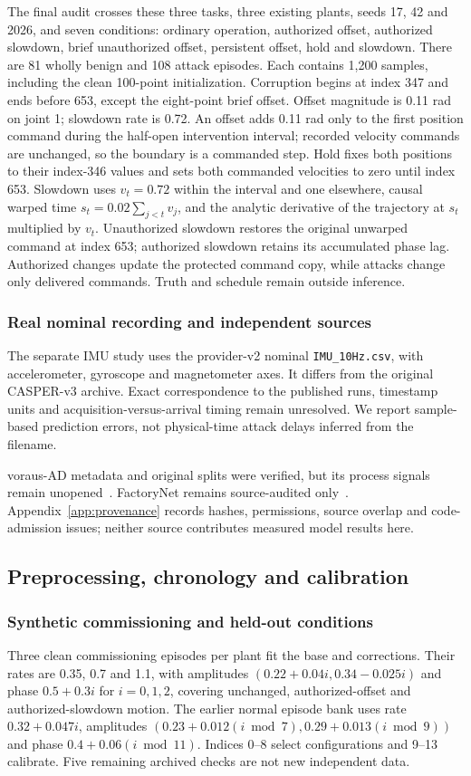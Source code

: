 The final audit crosses these three tasks, three existing plants, seeds 17, 42 and 2026, and seven conditions: ordinary operation, authorized offset, authorized slowdown, brief unauthorized offset, persistent offset, hold and slowdown. There are 81 wholly benign and 108 attack episodes. Each contains 1,200 samples, including the clean 100-point initialization. Corruption begins at index 347 and ends before 653, except the eight-point brief offset. Offset magnitude is 0.11 rad on joint 1; slowdown rate is 0.72. An offset adds 0.11 rad only to the first position command during the half-open intervention interval; recorded velocity commands are unchanged, so the boundary is a commanded step. Hold fixes both positions to their index-346 values and sets both commanded velocities to zero until index 653. Slowdown uses $v_t=0.72$ within the interval and one elsewhere, causal warped time $s_t=0.02\sum_{j<t}v_j$, and the analytic derivative of the trajectory at $s_t$ multiplied by $v_t$. Unauthorized slowdown restores the original unwarped command at index 653; authorized slowdown retains its accumulated phase lag. Authorized changes update the protected command copy, while attacks change only delivered commands. Truth and schedule remain outside inference.

\subsubsection{Real nominal recording and independent sources}
The separate IMU study uses the provider-v2 nominal \texttt{IMU\_10Hz.csv}, with accelerometer, gyroscope and magnetometer axes. It differs from the original CASPER-v3 archive. Exact correspondence to the published runs, timestamp units and acquisition-versus-arrival timing remain unresolved. We report sample-based prediction errors, not physical-time attack delays inferred from the filename.

voraus-AD metadata and original splits were verified, but its process signals remain unopened~\cite{voraus}. FactoryNet remains source-audited only~\cite{factory}. Appendix~\ref{app:provenance} records hashes, permissions, source overlap and code-admission issues; neither source contributes measured model results here.

\subsection{Preprocessing, chronology and calibration}
\subsubsection{Synthetic commissioning and held-out conditions}
Three clean commissioning episodes per plant fit the base and corrections. Their rates are 0.35, 0.7 and 1.1, with amplitudes $(0.22+0.04i,0.34-0.025i)$ and phase $0.5+0.3i$ for $i=0,1,2$, covering unchanged, authorized-offset and authorized-slowdown motion. The earlier normal episode bank uses rate $0.32+0.047i$, amplitudes $(0.23+0.012(i\bmod7),0.29+0.013(i\bmod9))$ and phase $0.4+0.06(i\bmod11)$. Indices 0--8 select configurations and 9--13 calibrate. Five remaining archived checks are not new independent data.

